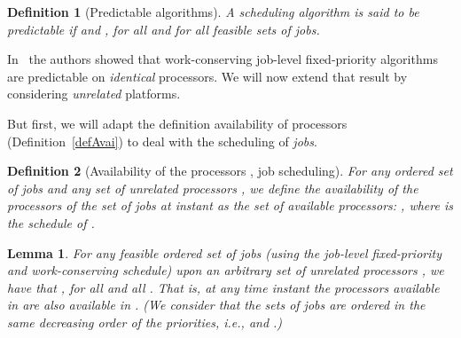 \documentclass[a4paper,11pt]{article}
\newtheorem{Definition}{Definition}
\newtheorem{Lemma}[Theorem]{Lemma}
\begin{document}
\begin{Definition}[Predictable algorithms]\label{predAlg}
  A scheduling algorithm is said to be {\em predictable} if  and , for all  and for all
feasible  sets of jobs.
\end{Definition}

In~\cite{Ha} the authors showed that work-conserving job-level fixed-priority
algorithms are predictable on \emph{identical} processors. We will now extend that result by considering \emph{unrelated} platforms.

But first, we will adapt the definition availability of processors (Definition~\ref{defAvai}) to deal with the scheduling of \emph{jobs}. 

\begin{Definition}[Availability of the processors , job scheduling]\label{defAvaiJob}
For any ordered set of jobs  and any set of  unrelated processors
, we define the
  {\em availability of the processors}  of the set of jobs 
  at instant  as the set of available processors: , where
   is the schedule of .
\end{Definition}

\begin{Lemma}\label{lemmaSoon} 
  For any feasible ordered set of jobs  (using the
  job-level fixed-priority and work-conserving schedule) upon an
  arbitrary set of unrelated processors , we
  have that , for all  and
  all . That is, at any time instant the processors available in
   are also available in . (We
  consider that the sets of jobs are ordered in the same decreasing
  order of the priorities, i.e.,  and
  .)
\end{Lemma}
\end{document}
